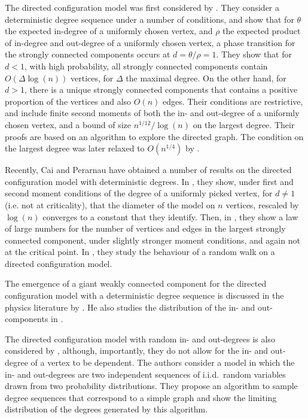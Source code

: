 The directed configuration model was first considered by \citet{cooperSizeLargestStrongly2004}. They consider a deterministic degree sequence under a number of conditions, and show that for $\theta$ the expected in-degree of a uniformly chosen vertex, and $\rho$ the expected product of in-degree and out-degree of a uniformly chosen vertex, a phase transition for the strongly connected components occurs at $d=\theta/\rho=1$. They show that for $d<1$, with high probability, all strongly connected components contain $O(\Delta\log(n))$ vertices, for $\Delta$ the maximal degree. On the other hand, for $d>1$, there is a unique strongly connected components that contains a positive proportion of the vertices and also $O(n)$ edges. Their conditions are restrictive, and include finite second moments of both the in- and out-degree of a uniformly chosen vertex, and a bound of size $n^{1/12}/\log(n)$ on the largest degree. Their proofs are based on an algorithm to explore the directed graph. The condition on the largest degree was later relaxed to $O(n^{1/4})$ by \citet{Graf2016}.

Recently, Cai and Perarnau have obtained a number of results on the directed configuration model with deterministic degrees. In \cite{caiDiameterDirectedConfiguration2020}, they show, under first and second moment conditions of the degree of a uniformly picked vertex, for $d\neq 1$ (i.e. not at criticality), that the diameter of the model on $n$ vertices, rescaled by $\log(n)$ converges to a constant that they identify. Then, in \cite{caiGiantComponentDirected2020}, they show a law of large numbers for the number of vertices and edges in the largest strongly connected component, under slightly stronger moment conditions, and again not at the critical point. In \cite{cai2021rw}, they study the behaviour of a random walk on a directed configuration model.
 
The emergence of a giant weakly connected component for the directed configuration model with a deterministic degree sequence is discussed in the physics literature by \citet{Kryven2016}. He also studies the distribution of the in- and out-components in \cite{Kryven2017}.

The directed configuration model with random in- and out-degrees is also considered by \citet{Chen2012}, although, importantly, they do not allow for the in- and out-degree of a vertex to be dependent. The authors consider a model in which the in- and out-degrees are two independent sequences of i.i.d.\ random variables drawn from two probability distributions. They propose an algorithm to sample degree sequences that correspond to a simple graph and show the limiting distribution of the degrees generated by this algorithm. 


